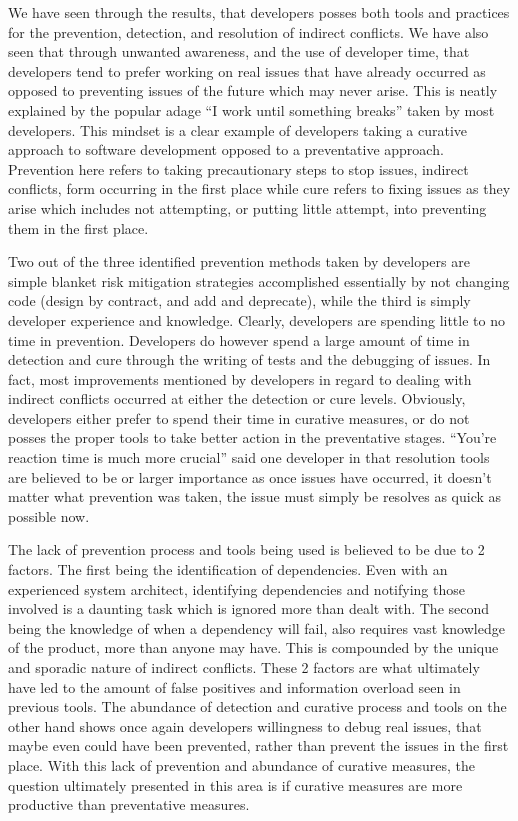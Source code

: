 \documentclass[conference]{IEEEtran}
\begin{document}
We have seen through the results, that developers posses both tools and practices for the prevention,
detection, and resolution of indirect conflicts. We have also seen that through unwanted awareness, and the use of developer time,
that developers tend to prefer working on real issues that have already occurred as opposed to preventing issues of the future which
may never arise. This is neatly explained by the popular adage ``I work until something breaks'' taken by most developers. This mindset
is a clear example of developers taking a curative approach to software development opposed to a preventative approach.
Prevention here refers to taking precautionary steps to stop issues, indirect conflicts, form occurring in the first
place while cure refers to fixing issues as they arise which includes not attempting, or putting little attempt, into preventing
them in the first place.

Two out of the three identified prevention methods taken by developers are simple blanket risk mitigation strategies
accomplished essentially by
not changing code (design by contract, and add and deprecate), while the third is simply developer experience and knowledge. Clearly,
developers are spending little to no time in prevention. Developers do however spend a large amount of time in detection and cure through the
writing of tests and the debugging of issues. In fact, most improvements mentioned by developers in regard to dealing with indirect
conflicts occurred at either the detection or cure levels. Obviously, developers either prefer to spend their time in curative
measures, or do not posses the proper tools to take better action in the preventative stages. ``You're reaction time is much more crucial''
said one developer in that resolution tools are believed to be or larger importance as once issues have occurred, it doesn't
matter what prevention was taken, the issue must simply be resolves as quick as possible now.

The lack of prevention process and tools being used is believed to be due to 2 factors. The first being the identification of dependencies.
Even with an experienced system architect, identifying dependencies and notifying those involved is a daunting task 
which is ignored more than dealt with. The second being the knowledge of when a dependency will fail, also requires vast knowledge
of the product, more than anyone may have. This is compounded by the unique and sporadic nature of indirect conflicts. These 2 factors
are what ultimately have led to the amount of false positives and information overload seen in previous tools. The
abundance of detection and curative process and tools on the other hand shows once again developers willingness to debug
real issues, that maybe even could have been prevented, rather than prevent the issues in the first place. With
this lack of prevention and abundance of curative measures, the question ultimately presented in this area is if 
curative measures are more productive than preventative measures.
\end{document}
